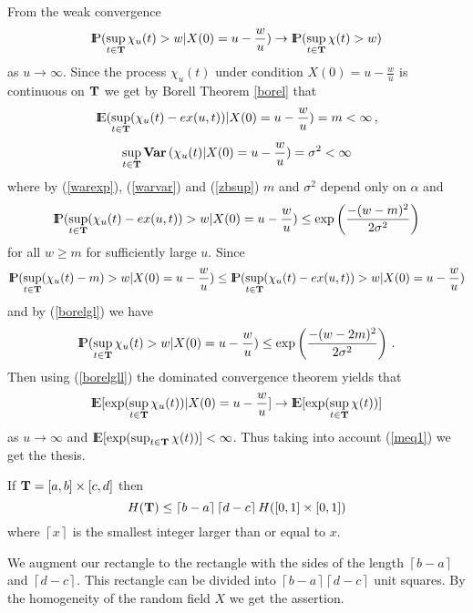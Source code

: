 From the weak convergence
\begin{equation}\label{zbsup}
{\rm I\hspace{-0.8mm}P}(\sup_{t\in{\bf T}}\chi_u(t)>w|X(0)=u-\frac{w}{u})\rightarrow
{\rm I\hspace{-0.8mm}P}(\sup_{t\in{\bf T}}\chi(t)>w)
\end{equation}
as $u\rightarrow\infty$.
Since the process $\chi_u(t)$ under condition $X(0)=u-\frac{w}{u}$ is continuous on ${\bf T}$
we get by Borell Theorem \ref{borel} that
$$
{\rm I\hspace{-0.8mm}E}(\sup_{t\in{\bf T}}(\chi_u(t)-ex(u,t))|X(0)=u-\frac{w}{u})= m<\infty\,,
$$
$$
\sup_{t\in{\bf T}}{\bf Var\,}(\chi_u(t)|X(0)=u-\frac{w}{u})= \sigma^2<\infty
$$
where by (\ref{warexp}), (\ref{warvar}) and (\ref{zbsup}) $m$  and $\sigma^2$ depend only on $\alpha$
and
\begin{equation}\label{borelgl}
{\rm I\hspace{-0.8mm}P}(\sup_{t\in{\bf T}}(\chi_u(t)-ex(u,t))>w|X(0)=u-\frac{w}{u})
\leq \exp\left(\frac{-(w-m)^2}{2\sigma^2}\right)
\end{equation}
for all $w\geq m$ for sufficiently large $u$. Since
$$
{\rm I\hspace{-0.8mm}P}(\sup_{t\in{\bf T}}(\chi_u(t)-m)>w|X(0)=u-\frac{w}{u})\leq
{\rm I\hspace{-0.8mm}P}(\sup_{t\in{\bf T}}(\chi_u(t)-ex(u,t))>w|X(0)=u-\frac{w}{u})
$$
and by (\ref{borelgl}) we have
\begin{equation}\label{borelgll}
{\rm I\hspace{-0.8mm}P}(\sup_{t\in{\bf T}}\chi_u(t)>w|X(0)=u-\frac{w}{u})
\leq \exp\left(\frac{-(w-2m)^2}{2\sigma^2}\right)\,.
\end{equation}
Then using (\ref{borelgll}) the dominated convergence theorem yields
that
$$
{\rm I\hspace{-0.8mm}E} [\exp(\sup_{t\in{\bf T}}\chi_u(t))|X(0)=u-\frac{w}{u}]\rightarrow
{\rm I\hspace{-0.8mm}E} [\exp(\sup_{t\in{\bf T}}\chi(t))]
$$
as $u\rightarrow\infty$ and ${\rm I\hspace{-0.8mm}E} [\exp(\sup_{t\in{\bf T}}\chi(t))]<\infty$. Thus taking into account 
(\ref{meq1}) we get the thesis.
\halmos

\begin{corollary}\label{estht}
If ${\bf T}=[a,b]\times [c,d]$ then
$$
H({\bf T})\leq \left\lceil b-a \right\rceil\left\lceil d-c \right\rceil
H([0,1]\times [0,1])
$$
where $\left\lceil x\right\rceil$ is the smallest integer larger than or equal to $x$. 
\end{corollary}
\proof 
We augment our rectangle to the rectangle with the sides of the length $\left\lceil b-a \right\rceil$ and
$\left\lceil d-c \right\rceil$. This rectangle can be divided into $\left\lceil b-a \right\rceil\left\lceil d-c \right\rceil$ unit squares. By the homogeneity of the random field $X$ we get the assertion. 
\halmos

